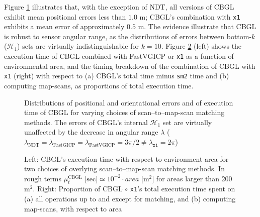 Figure \ref{fig:c:errors_and_time} illustrates that, with the exception of NDT,
all versions of CBGL exhibit mean positional errors less than $1.0$ m; CBGL's
combination with \texttt{x1} exhibits a mean error of approximately $0.5$ m.
The evidence illustrate that CBGL is robust to sensor angular range, as the
distributions of errors between bottom-$k$ ($\mathcal{H}_1$) sets are virtually
indistinguishable for $k=10$. Figure \ref{fig:c:time_analysis} (left) shows the
execution time of CBGL combined with FastVGICP or \texttt{x1} as a function of
environmental area, and the timing breakdown of the combination of CBGL with
\texttt{x1} (right) with respect to (a) CBGL's total time minus \texttt{sm2}
time and (b) computing map-scans, as proportions of total execution time.

\begin{figure}[H]
  
  \vspace{0.01cm}
  \caption{\small Distributions of positional and orientational errors and of
           execution time of CBGL for varying choices of scan--to--map-scan
           matching methods. The errors of CBGL's internal $\mathcal{H}_1$ set
           are virtually unaffected by the decrease in angular range $\lambda$
           ($\lambda_{\text{NDT}} = \lambda_{\text{FastGICP}} =
           \lambda_{\text{FastVGICP}} = 3\pi/2 \neq \lambda_{\texttt{x1}} = 2\pi$)
           }
  \label{fig:c:errors_and_time}
  \vspace{0.2cm}
\end{figure}

\begin{figure}[H]
  
  \vspace{0.6cm}
  \caption{\small Left: CBGL's execution time with respect to environment area
           for two choices of overlying scan--to--map-scan matching methods. In
           rough terms $\mu_t^{\text{CBGL}} \text{ [sec]} \simeq 10^{-2}\cdot area
           \text{ [} \text{m}^2 \text{]}$ for areas larger than 200 m$^2$.
           Right: Proportion of CBGL $\circ$ \texttt{x1}'s total execution time
           spent on (a) all operations up to and except for matching, and (b)
           computing map-scans, with respect to area}
  \label{fig:c:time_analysis}
\end{figure}
